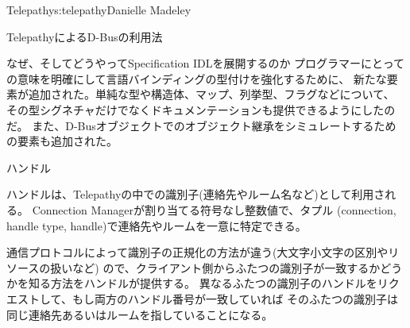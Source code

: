 \begin{aosachapter}{Telepathy}{s:telepathy}{Danielle Madeley}
\begin{aosasect1}{TelepathyによるD-Busの利用法}
\begin{aosabox}{なぜ、そしてどうやってSpecification IDLを展開するのか}
プログラマーにとっての意味を明確にして言語バインディングの型付けを強化するために、
新たな要素が追加された。単純な型や構造体、マップ、列挙型、フラグなどについて、
その型シグネチャだけでなくドキュメンテーションも提供できるようにしたのだ。
また、D-Busオブジェクトでのオブジェクト継承をシミュレートするための要素も追加された。

\end{aosabox}


\begin{aosasect2}{ハンドル}

ハンドルは、Telepathyの中での識別子(連絡先やルーム名など)として利用される。
Connection Managerが割り当てる符号なし整数値で、タプル
(connection, handle type, handle)で連絡先やルームを一意に特定できる。

\pagebreak

通信プロトコルによって識別子の正規化の方法が違う(大文字小文字の区別やリソースの扱いなど)
ので、クライアント側からふたつの識別子が一致するかどうかを知る方法をハンドルが提供する。
異なるふたつの識別子のハンドルをリクエストして、もし両方のハンドル番号が一致していれば
そのふたつの識別子は同じ連絡先あるいはルームを指していることになる。


\end{aosasect2}
\end{aosasect1}
\end{aosachapter}
